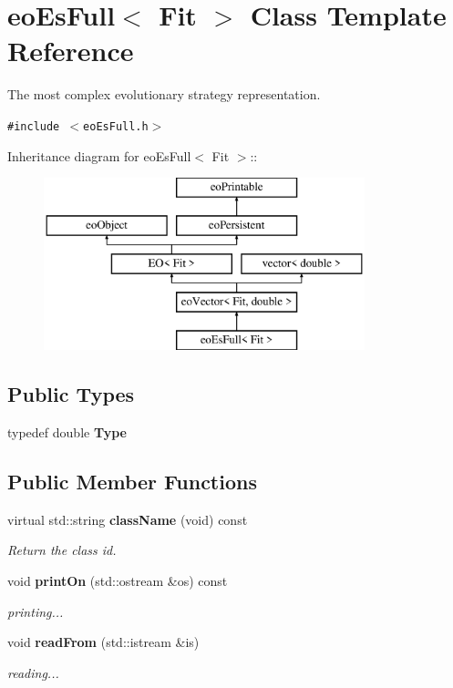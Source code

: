 \section{eo\-Es\-Full$<$ Fit $>$ Class Template Reference}
\label{classeo_es_full}
The most complex evolutionary strategy representation.  


{\tt \#include $<$eo\-Es\-Full.h$>$}

Inheritance diagram for eo\-Es\-Full$<$ Fit $>$::\begin{figure}[H]
\begin{center}
\leavevmode
\includegraphics[height=5cm]{classeo_es_full}
\end{center}
\end{figure}
\subsection*{Public Types}
\begin{CompactItemize}
\item 
typedef double {\bf Type}\label{classeo_es_full_w0}

\end{CompactItemize}
\subsection*{Public Member Functions}
\begin{CompactItemize}
\item 
virtual std::string {\bf class\-Name} (void) const 
\begin{CompactList}\small\item\em Return the class id. \item\end{CompactList}\item 
void {\bf print\-On} (std::ostream \&os) const \label{classeo_es_full_a2}

\begin{CompactList}\small\item\em printing... \item\end{CompactList}\item 
void {\bf read\-From} (std::istream \&is)\label{classeo_es_full_a3}

\begin{CompactList}\small\item\em reading... \item\end{CompactList}\end{CompactItemize}
